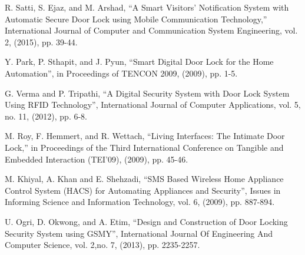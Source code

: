 \documentclass[twoside,a4paper,16pt]{book}
\begin{document}
{{\begin{enumerate}[label={[\arabic*]}]
	\item R. Satti, S. Ejaz, and M. Arshad, “A Smart Visitors’ Notification System with Automatic Secure Door Lock using Mobile Communication Technology,” International Journal of Computer and Communication System Engineering, vol. 2, (2015), pp. 39-44.\\
	\item Y. Park, P. Sthapit, and J. Pyun, “Smart Digital Door Lock for the Home Automation”, in Proceedings of TENCON 2009, (2009), pp. 1-5.\\
	\item 	G. Verma and P. Tripathi, “A Digital Security System with Door Lock System Using RFID Technology”, International Journal of Computer Applications, vol. 5, no. 11, (2012), pp. 6-8.\\
	\item M. Roy, F. Hemmert, and R. Wettach, “Living Interfaces: The Intimate Door Lock,” in Proceedings of the Third International Conference on Tangible and Embedded Interaction (TEI'09), (2009), pp. 45-46.\\
	\item M. Khiyal, A. Khan and E. Shehzadi, “SMS Based Wireless Home Appliance Control System (HACS) for Automating Appliances and Security”, Issues in Informing Science and Information Technology, vol. 6, (2009), pp. 887-894.\\
	\item U. Ogri, D. Okwong, and A. Etim, “Design and Construction of Door Locking Security System using GSMY”, International Journal Of Engineering And Computer Science, vol. 2,no. 7, (2013), pp. 2235-2257.\\
	
\end{enumerate}
}}
\end{document}
